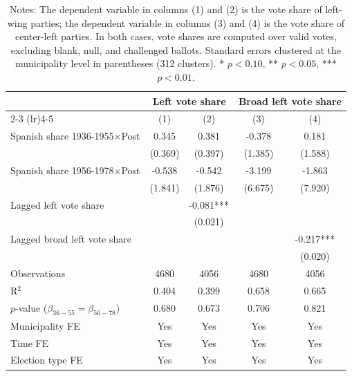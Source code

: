 \begin{table}[!h]
\caption{Effects on Left-Wing Vote Shares}
\renewcommand{\arraystretch}{1.25}
\setlength{\tabcolsep}{8pt}
\centering
\begin{tabular}[t]{lcccc}
\hline
 & \multicolumn{2}{c}{Left vote share} & \multicolumn{2}{c}{Broad left vote share} \\
\cmidrule(lr){2-3} \cmidrule(lr){4-5}
  & (1) & (2) & (3) & (4)\\
\hline
Spanish share 1936-1955$\times$Post & 0.345 & 0.381 & -0.378 & 0.181\\
 & (0.369) & (0.397) & (1.385) & (1.588)\\
Spanish share 1956-1978$\times$Post & -0.538 & -0.542 & -3.199 & -1.863\\
 & (1.841) & (1.876) & (6.675) & (7.920)\\
Lagged left vote share &  & -0.081*** &  & \\
 &  & (0.021) &  & \\
Lagged broad left vote share &  &  &  & -0.217***\\
 &  &  &  & (0.020)\\

\addlinespace
Observations & 4680 & 4056 & 4680 & 4056\\
R$^2$ & 0.404 & 0.399 & 0.658 & 0.665\\
$p$-value ($\beta_{36{-}55} = \beta_{56{-}78}$) & 0.680 & 0.673 & 0.706 & 0.821\\
Municipality FE & Yes & Yes & Yes & Yes\\
Time FE & Yes & Yes & Yes & Yes\\
Election type FE & Yes & Yes & Yes & Yes\\
\hline
\end{tabular}
\vspace{0.3em}
\captionsetup{justification=justified}
\caption*{\footnotesize Notes: The dependent variable in columns (1) and (2) is the vote share of left-wing parties; the dependent variable in columns (3) and (4) is the vote share of center-left parties. In both cases, vote shares are computed over valid votes, excluding blank, null, and challenged ballots. Standard errors clustered at the municipality level in parentheses (312 clusters). * $p<0.10$, ** $p<0.05$, *** $p<0.01$.}
\end{table}
